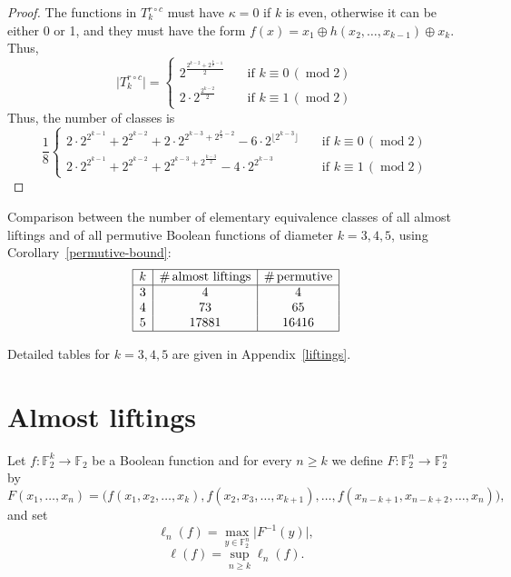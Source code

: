 \documentclass[11pt,english,a4paper]{amsart}
\theoremstyle{plain}
\theoremstyle{definition}
\theoremstyle{remark}
\newcommand{\F}{\mathbb{F}}
\begin{document}
\begin{proof}
    The functions in $T^{r \circ c}_k$ must have $\kappa=0$ if $k$ is even, otherwise it can be either 0 or 1, and they must have the form $f(x) = x_1 \oplus h(x_2, \dotsc, x_{k-1}) \oplus x_k$. Thus,
    \[
    \lvert T^{r \circ c}_k\rvert=
    \begin{cases}
        2^{\frac{2^{k-2}+2^{\frac{k}{2}-1}}{2}} &\quad\text{if }k \equiv 0\, (\operatorname{mod} 2)\\
        2 \cdot 2^{\frac{2^{k-2}}{2}} &\quad\text{if }k \equiv 1\, (\operatorname{mod} 2)
    \end{cases}
    \]
    Thus, the number of classes is
    \[
    \frac{1}{8}
    \begin{cases}
        2 \cdot 2^{2^{k-1}} + 2^{2^{k-2}} + 2 \cdot 2^{2^{k-3} + 2^{\frac{k}{2}-2}} - 6 \cdot 2^{\lfloor 2^{k-3} \rfloor} &\quad\text{if }k \equiv 0\, (\operatorname{mod} 2)\\
        2 \cdot 2^{2^{k-1}} + 2^{2^{k-2}} + 2^{2^{k-3} + 2^{\frac{k-3}{2}}} - 4 \cdot 2^{2^{k-3}} &\quad\text{if }k \equiv 1\, (\operatorname{mod} 2)
    \end{cases}
    \]
    \end{proof}

    Comparison between the number of elementary equivalence classes of all almost liftings and of all permutive Boolean functions of diameter $k=3,4,5$, using Corollary~\ref{permutive-bound}:
    \[
	\begin{array}{|c|c|c|} \hline
		k & \#\,\text{almost liftings} & \#\,\text{permutive} \\ \hline
		3 & 4 & 4 \\
		4 & 73 & 65 \\
		5 & 17881 & 16416 \\ \hline
	\end{array}
	\]
	
	Detailed tables for $k=3,4,5$ are given in Appendix~\ref{liftings}.
	
	\section{Almost liftings}\label{sec-almost}
	
	Let $f\colon\F_2^k\to\F_2$ be a Boolean function and for every $n\geq k$ we define $F\colon \F_2^n\to\F_2^n$ by
	\[
	F(x_1,\dotsc,x_n)= \Big( f(x_1,x_2,\dotsc,x_k),
	f(x_2,x_3,\dotsc,x_{k+1}),\dotsc,
	f(x_{n-k+1},x_{n-k+2},\dotsc, x_n) \Big),
	\]
	and set
	\[
	\ell_n(f)=\max_{y\in\F_2^n} \lvert F^{-1}(y)\rvert,
	\]
	\[
	\ell(f)=\sup_{n\geq k}\ell_n(f).
	\]
	
\end{document}
